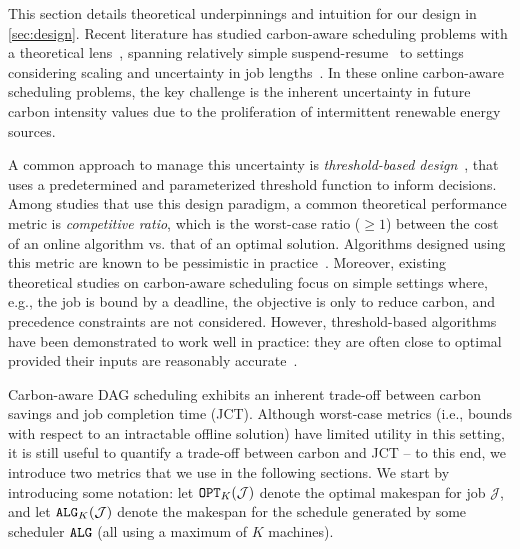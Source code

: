 This section details theoretical underpinnings and intuition for our design in \autoref{sec:design}.
Recent literature has studied carbon-aware scheduling problems with a theoretical lens~\cite{Lechowicz:23,Lechowicz:24,Lechowicz:24CFL,Bostandoost:24}, spanning relatively simple suspend-resume~\cite{Lechowicz:23} to settings considering scaling and uncertainty in job lengths~\cite{Bostandoost:24}.
In these online carbon-aware scheduling problems, the key challenge is the inherent uncertainty in future carbon intensity values due to the proliferation of intermittent renewable energy sources. 

A common approach to manage this uncertainty is \textit{threshold-based design}~\cite{Lechowicz:23, Bostandoost:24:HotCarbon, Wiesner:2021:WaitAwhile}, %
that uses a predetermined and parameterized threshold function to inform decisions. 
Among studies that use this design paradigm, a common theoretical performance metric is \textit{competitive ratio}, %
which is the worst-case ratio ($\geq 1$) between the cost of an online algorithm vs. that of an optimal solution.  Algorithms designed using this metric are known to be pessimistic in practice~\cite{Lykouris:18, Purohit:18}.  Moreover, existing theoretical studies on carbon-aware scheduling focus on simple settings where, e.g., the job is bound by a deadline, the objective is only to reduce carbon, and precedence constraints are not considered.
However, threshold-based algorithms have been demonstrated to work well in practice: they are often close to optimal provided their inputs are reasonably accurate~\cite{Daneshvaramoli:24}.



Carbon-aware DAG scheduling exhibits an inherent trade-off between carbon savings and job completion time (JCT).  
Although worst-case metrics %
(i.e., bounds with respect to an intractable offline solution) have limited utility in this setting, it is still useful to quantify a trade-off between carbon and JCT -- to this end, we introduce two metrics that we use in the following sections.
We start by introducing some notation:  let $\texttt{OPT}_K(\mathcal{J})$ denote the optimal makespan for job $\mathcal{J}$, and let $\texttt{ALG}_K(\mathcal{J})$ denote the makespan for the schedule generated by some scheduler $\texttt{ALG}$ (all using a maximum of $K$ machines).

